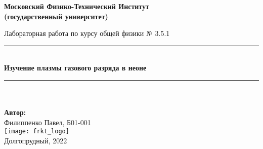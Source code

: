 \newcommand{\HRule}{\rule{\linewidth}{0.7mm}} %
	
	\begin{center}
		\large\textbf{Московский Физико-Технический Институт}\\ %
		\large\textbf{(государственный университет)}
	
		\vfill
		
		\Large Лабораторная работа по курсу общей физики № 3.5.1\\[0.5cm] %
		
		
		\HRule
		\\[0.4cm]
		{ \huge \bfseries Изучение плазмы газового разряда в неоне}%
		\\[0.4cm] 
		\HRule
		\\[0.5cm]
		
		\ \\
	\textbf{\large Автор:} \\	
	\large Филиппенко Павел, Б01-001\\ %
		\vfill
		\hspace*{-0.8 cm}\texttt{[image: frkt\_logo]}\\ %
		\large Долгопрудный, 2022 %
	\end{center}

\newpage
\setcounter{page}{2}
\fancyfoot[c]{\thepage}
\fancyhead[R]{}